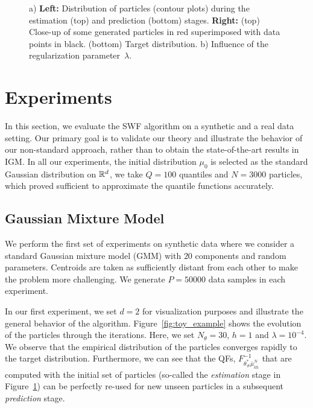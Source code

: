 
\begin{figure}
\centering
{} \hspace{30pt}
\caption{a) \textbf{Left:} Distribution of particles (contour plots) during the estimation (top) and prediction (bottom) stages. \textbf{Right:} (top) Close-up of some generated particles in red superimposed with data points in black. (bottom) Target distribution. b) Influence of the regularization parameter~$\lambda$. }
\label{fig:gmm1}
\end{figure}

\section{Experiments}


%
In this section, we evaluate the SWF algorithm on a synthetic and a real data setting. Our primary goal is to validate our theory and illustrate the behavior of our non-standard approach, rather than to obtain the state-of-the-art results in IGM. In all our experiments, the initial distribution $\mu_0$ is selected as the standard Gaussian distribution on $\mathbb{R}^d$, we take $Q=100$ quantiles and $N=3000$ particles, which proved sufficient to approximate the quantile functions accurately.


\subsection{Gaussian Mixture Model }
We perform the first set of experiments on synthetic data where we consider a standard Gaussian mixture model (GMM) with $20$ components and random parameters. Centroids are taken as sufficiently distant from each other to make the problem more challenging. We generate $P=50000$ data samples in each experiment.

In our first experiment, we set $d=2$ for visualization purposes and illustrate the general behavior of the algorithm. Figure~\ref{fig:toy_example} shows the evolution of the particles through the iterations. Here, we set $N_\theta=30$, $h=1$ and $\lambda=10^{-4}$.
%
We observe that the empirical distribution of the particles converges rapidly to the target distribution. Furthermore, we can see that the QFs, $F^{-1}_{\theta^*_\#\bar{\mu}_{kh}^{N}}$ that are computed with the initial set of particles (so-called the \textit{estimation} stage in Figure~\ref{fig:gmm1}) can be perfectly re-used for new unseen particles in a subsequent \textit{prediction} stage.

